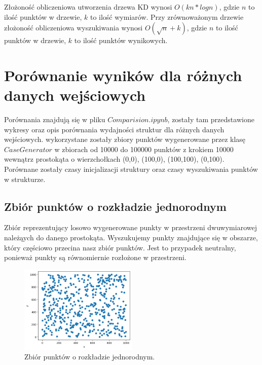 \documentclass{lab}
\begin{document}
Złożoność obliczeniowa utworzenia drzewa KD wynosi $O(kn*logn)$, gdzie $n$ to ilość punktów w drzewie, $k$ to ilość wymiarów. Przy zrównoważonym drzewie złożoność obliczeniowa wyszukiwania wynosi $O(\sqrt{n}+k)$, gdzie $n$ to ilość punktów w drzewie, $k$ to ilość punktów wynikowych.

\section{Porównanie wyników dla różnych danych wejściowych}
Porównania znajdują się w pliku $Comparision.ipynb$, zostały tam przedstawione wykresy oraz opis porównania wydajności struktur dla różnych danych wejściowych.
wykorzystane zostały zbiory punktów wygenerowane przez klasę $CaseGenerator$ w zbiorach od 10000 do 100000 punktów z krokiem 10000 wewnątrz prostokąta o wierzchołkach (0,0), (100,0), (100,100), (0,100).
Porównane zostały czasy inicjalizacji struktury oraz czasy wyszukiwania punktów w strukturze.
\newpage
\subsection{Zbiór punktów o rozkładzie jednorodnym}
Zbiór reprezentujący losowo wygenerowane punkty w przestrzeni dwuwymiarowej należąych do danego prostokąta.
Wyszukujemy punkty znajdujące się w obszarze, który częściowo przecina nasz zbiór
punktów. Jest to przypadek neutralny, ponieważ punkty są równomiernie rozłożone w przestrzeni.

\begin{figure}[H]
  \centering
  \includegraphics[width=0.5\textwidth]{resources/uniform.png}
  \caption{Zbiór punktów o rozkładzie jednorodnym.}
  \label{fig:uniform}
\end{figure}
\end{document}
